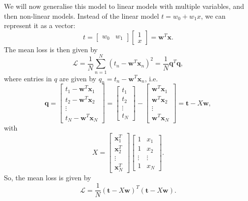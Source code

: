 \documentclass[a4paper, openany]{memoir}
\begin{document}
    We will now generalise this model to linear models with multiple variables, and then non-linear models. Instead of the linear model $t = w_0 + w_1x$, we can represent it as a vector:
    \[t = \begin{bmatrix}
        w_0 & w_1
    \end{bmatrix} \begin{bmatrix}
        1 \\
        x
    \end{bmatrix} = \textbf{w}^T \textbf{x}.\]
    The mean loss is then given by
    \[\mathcal{L} = \frac{1}{N} \sum_{n=1}^N (t_n - \textbf{w}^T \mathbf{x}_n)^2 = \frac{1}{N} \mathbf{q}^T \mathbf{q},\]
    where entries in $q$ are given by $q_n = t_n - \textbf{w}^T \mathbf{x}_n$, i.e.
    \[\mathbf{q} = \begin{bmatrix}
        t_1 - \mathbf{w}^T \mathbf{x}_1 \\
        t_2 - \mathbf{w}^T \mathbf{x}_2 \\
        \vdots \\
        t_N - \mathbf{w}^T \mathbf{x}_N
    \end{bmatrix} = \begin{bmatrix}
        t_1 \\
        t_2 \\
        \vdots \\
        t_N
    \end{bmatrix} - \begin{bmatrix}
        \mathbf{w}^T \mathbf{x}_1 \\
        \mathbf{w}^T \mathbf{x}_2 \\
        \vdots \\
        \mathbf{w}^T \mathbf{x}_N
    \end{bmatrix} = \mathbf{t} - X\mathbf{w},\]
    with
    \[X = \begin{bmatrix}
        \mathbf{x}_1^T \\
        \mathbf{x}_2^T \\
        \vdots \\
        \mathbf{x}_N^T
    \end{bmatrix} \begin{bmatrix}
        1 & x_1 \\
        1 & x_2 \\
        \vdots & \vdots \\
        1 & x_N
    \end{bmatrix}.\]
    So, the mean loss is given by
    \[\mathcal{L} = \frac{1}{N} (\mathbf{t} - X \mathbf{w})^T (\mathbf{t} - X \mathbf{w}).\]
\end{document}
